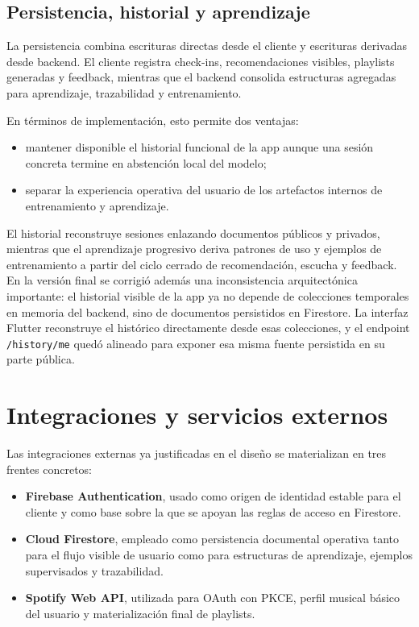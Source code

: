 \subsection{Persistencia, historial y aprendizaje}
\label{subsec:modulo_persistencia_aprendizaje}

La persistencia combina escrituras directas desde el cliente y escrituras
derivadas desde backend. El cliente registra check-ins, recomendaciones
visibles, playlists generadas y feedback, mientras que el backend consolida
estructuras agregadas para aprendizaje, trazabilidad y entrenamiento.

En términos de implementación, esto permite dos ventajas:

\begin{itemize}
    \item mantener disponible el historial funcional de la app aunque una
    sesión concreta termine en abstención local del modelo;
    \item separar la experiencia operativa del usuario de los artefactos
    internos de entrenamiento y aprendizaje.
\end{itemize}

El historial reconstruye sesiones enlazando documentos públicos y privados,
mientras que el aprendizaje progresivo deriva patrones de uso y ejemplos de
entrenamiento a partir del ciclo cerrado de recomendación, escucha y feedback.
En la versión final se corrigió además una inconsistencia arquitectónica
importante: el historial visible de la app ya no depende de colecciones
temporales en memoria del backend, sino de documentos persistidos en Firestore.
La interfaz Flutter reconstruye el histórico directamente desde esas
colecciones, y el endpoint \texttt{/history/me} quedó alineado para exponer esa
misma fuente persistida en su parte pública.

\section{Integraciones y servicios externos}
\label{sec:integraciones}

Las integraciones externas ya justificadas en el diseño se materializan en tres
frentes concretos:

\begin{itemize}
    \item \textbf{Firebase Authentication}, usado como origen de identidad
    estable para el cliente y como base sobre la que se apoyan las reglas de
    acceso en Firestore.
    \item \textbf{Cloud Firestore}, empleado como persistencia documental
    operativa tanto para el flujo visible de usuario como para estructuras de
    aprendizaje, ejemplos supervisados y trazabilidad.
    \item \textbf{Spotify Web API}, utilizada para OAuth con PKCE, perfil
    musical básico del usuario y materialización final de playlists.
\end{itemize}


